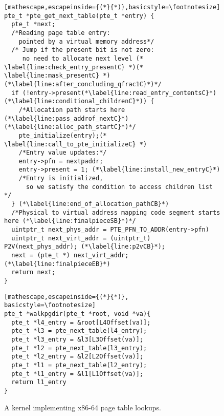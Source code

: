\begin{figure}
\begin{subfigure}
\begin{tikzpicture}[x=0.75pt,y=0.75pt,yscale=-0.75,xscale=0.75]
\end{tikzpicture}
          \caption{x86-64 page table lookups.}
        \label{fig:pagetables}
    \end{subfigure}
    \vfill
\begin{minipage}{.5\textwidth}
\begin{lstlisting}[mathescape,escapeinside={(*}{*)},basicstyle=\footnotesize]
pte_t *pte_get_next_table(pte_t *entry) {
  pte_t *next;
  /*Reading page table entry:
    pointed by a virtual memory address*/
  /* Jump if the present bit is not zero:
     no need to allocate next level (* \label{line:check_entry_presentC} *)(* \label{line:mask_presentC} *)  (*\label{line:after_concluding_qfrac1C}*)*/
  if (!entry->present(*\label{line:read_entry_contentsC}*) (*\label{line:conditional_childrenC}*)) {
    /*Allocation path starts here (*\label{line:pass_addrof_nextC}*)(*\label{line:alloc_path_startC}*)*/
    pte_initialize(entry);(* \label{line:call_to_pte_initializeC} *)
    /*Entry value updates:*/
    entry->pfn = nextpaddr;
    entry->present = 1; (*\label{line:install_new_entryC}*)
    /*Entry is initialized,
      so we satisfy the condition to access children list */
  } (*\label{line:end_of_allocation_pathCB}*)
  /*Physical to virtual address mapping code segment starts here (*\label{line:finalpieceSB}*)*/
  uintptr_t next_phys_addr = PTE_PFN_TO_ADDR(entry->pfn)
  uintptr_t next_virt_addr = (uintptr_t) P2V(next_phys_addr); (*\label{line:p2vCB}*);
  next = (pte_t *) next_virt_addr;(*\label{line:finalpieceEB}*)
  return next;
}
\end{lstlisting}
\end{minipage}
\hfill\hfill
\begin{minipage}{.4\textwidth}
\begin{lstlisting}[mathescape,escapeinside={(*}{*)}, basicstyle=\footnotesize]
pte_t *walkpgdir(pte_t *root, void *va){ 
  pte_t *l4_entry = &root[L4Offset(va)];
  pte_t *l3 = pte_next_table(l4_entry);
  pte_t *l3_entry = &l3[L3Offset(va)];
  pte_t *l2 = pte_next_table(l3_entry);
  pte_t *l2_entry = &l2[L2Offset(va)];  
  pte_t *l1 = pte_next_table(l2_entry);
  pte_t *l1_entry = &l1[L1Offset(va)];  
  return l1_entry
}
\end{lstlisting}
\end{minipage}
    \vspace{-2.5em}
    \caption{A kernel implementing x86-64 page table lookups.}
    \label{fig:pagetablescode}
    \vspace{-1em}
\end{figure}

